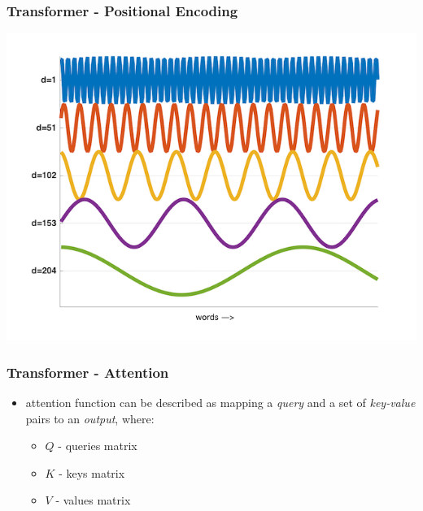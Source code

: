 \documentclass{beamer}
\begin{document}
\begin{frame}
    \frametitle{Transformer - Positional Encoding}
    \begin{center}
        \includegraphics[scale=0.425]{img/positional_encodings.png}
    \end{center}
\end{frame}

\begin{frame}
    \frametitle{Transformer - Attention}
    \begin{itemize}
        \item attention function can be described as mapping a \textit{query} and a set of \textit{key-value} pairs to an \textit{output}, where:
        \begin{itemize}
        	\item $ Q $ - queries matrix
        	\item $ K $ - keys matrix
        	\item $ V $ - values matrix
        \end{itemize}
    \end{itemize}
\end{frame}
\end{document}
